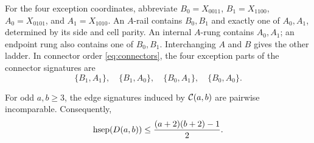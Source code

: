 For the four exception coordinates, abbreviate
\(B_0=X_{0011}\), \(B_1=X_{1100}\),
\(A_0=X_{0101}\), and \(A_1=X_{1010}\).  An \(A\)-rail contains
\(B_0,B_1\) and exactly one of \(A_0,A_1\), determined by its side and cell
parity.  An internal \(A\)-rung contains \(A_0,A_1\); an endpoint rung also
contains one of \(B_0,B_1\).  Interchanging \(A\) and \(B\) gives the other
ladder.  In connector order \cref{eq:connectors}, the four exception parts of
the connector signatures are
\begin{equation}
\label{eq:connector-signatures}
 \{B_1,A_1\},\quad\{B_1,A_0\},\quad
 \{B_0,A_1\},\quad\{B_0,A_0\}.
\end{equation}

\begin{theorem}
\label{thm:separating-family}
For odd \(a,b\ge3\), the edge signatures induced by \(\mathcal{C}(a,b)\) are
pairwise incomparable.  Consequently,
\[
 \operatorname{hsep}(D(a,b))\le \frac{(a+2)(b+2)-1}{2}.
\]
\end{theorem}

